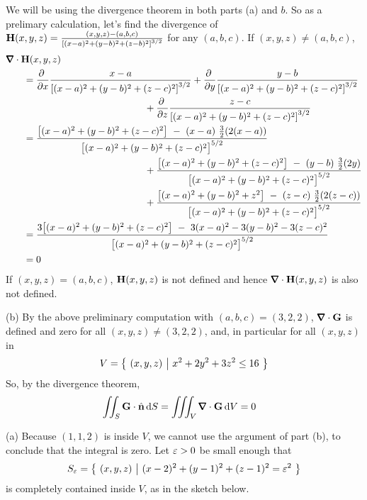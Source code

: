 \begin{solution}
We will be using the divergence theorem in both parts (a) and $b$. 
So as a prelimary calculation, let's find the divergence of
$\mathbf{H}(x,y,z)=\frac{(x,y,z)-(a,b,c)}{{[(x-a)^2+(y-b)^2+(z-b)^2]}^{3/2}}$
for any $(a,b,c)$. If $(x,y,z)\ne(a,b,c)$,
\begin{align*}
&\vnabla\cdot\vH(x,y,z) \\
&\hskip0.25in
=\pdiff{}{x}\frac{x-a}
               {{[(x-a)^2+(y-b)^2+(z-c)^2]}^{3/2}}
+\pdiff{}{y}\frac{y-b}
               {{[(x-a)^2+(y-b)^2+(z-c)^2]}^{3/2}} \\&\hskip2in
+\pdiff{}{z}\frac{z-c}
                {{[(x-a)^2+(y-b)^2+(z-c)^2]}^{3/2}}
\\
&\hskip0.25in
=\frac{\big[(x-a)^2+(y-b)^2+(z-c)^2\big]\ -\ (x-a)\ \frac{3}{2}(2(x-a))}
                       {{\big[(x-a)^2+(y-b)^2+(z-c)^2\big]}^{5/2}}
   \\&\hskip2in
+\frac{\big[(x-a)^2+(y-b)^2+(z-c)^2\big]\ -\ (y-b)\ \frac{3}{2}(2y)}
                        {{\big[(x-a)^2+(y-b)^2+(z-c)^2\big]}^{5/2}}
    \\&\hskip2in
+\frac{\big[(x-a)^2+(y-b)^2+z^2\big]\ -\ (z-c)\ \frac{3}{2}(2(z-c))}
                       {{\big[(x-a)^2+(y-b)^2+(z-c)^2\big]}^{5/2}}
\\
&\hskip0.25in
=\frac{3\big[(x-a)^2+(y-b)^2+(z-c)^2\big]\ -\ 3(x-a)^2-3(y-b)^2-3(z-c)^2}
                       {{\big[(x-a)^2+(y-b)^2+(z-c)^2\big]}^{5/2}} \\
&\hskip0.25in=0
\end{align*}
If $(x,y,z)=(a,b,c)$, $\mathbf{H}(x,y,z)$ is not defined 
and hence $\vnabla\cdot\vH(x,y,z)$ is also not defined.

(b) By the above preliminary computation with $(a,b,c)=(3,2,2)$, 
$\vnabla\cdot\vG$ is defined and zero for all $(x,y,z)\ne (3,2,2)$,
and, in particular for all $(x,y,z)$ in
\begin{equation*}
V=\big\{ \ (x,y,z)\ \big|\ x^2+2y^2+3z^2\le 16\ \big\}
\end{equation*}
So, by the divergence theorem,
\begin{align*}
\dblInt_S \vG\cdot\hn\,\dee{S}
&=\tripInt_V\vnabla\cdot\vG\,\dee{V}
=0
\end{align*}

(a) Because $(1,1,2)$ is inside $V$, we cannot use the argument of part (b),
to conclude that the integral is zero. Let $\varepsilon>0$ be small enough
that
\begin{equation*}
S_\varepsilon = \big\{ \ (x,y,z)\ \big|\ (x-2)^2 + (y-1)^2 +(z-1)^2=\varepsilon^2\ \big\}
\end{equation*}
is completely contained inside $V$, as in the sketch below.


\end{solution}
